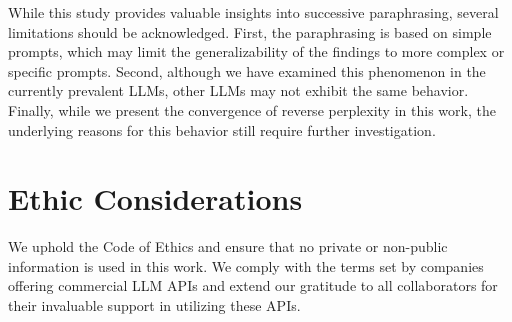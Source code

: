 While this study provides valuable insights into successive paraphrasing, several limitations should be acknowledged. 
First, the paraphrasing is based on simple prompts, which may limit the generalizability of the findings to more complex or specific prompts. Second, although we have examined this phenomenon in the currently prevalent LLMs, other LLMs may not exhibit the same behavior. 
Finally, while we present the convergence of reverse perplexity in this work, the underlying reasons for this behavior still require further investigation.

\section*{Ethic Considerations}

We uphold the Code of Ethics and ensure that no private or non-public information is used in this work. We comply with the terms set by companies offering commercial LLM APIs and extend our gratitude to all collaborators for their invaluable support in utilizing these APIs.











